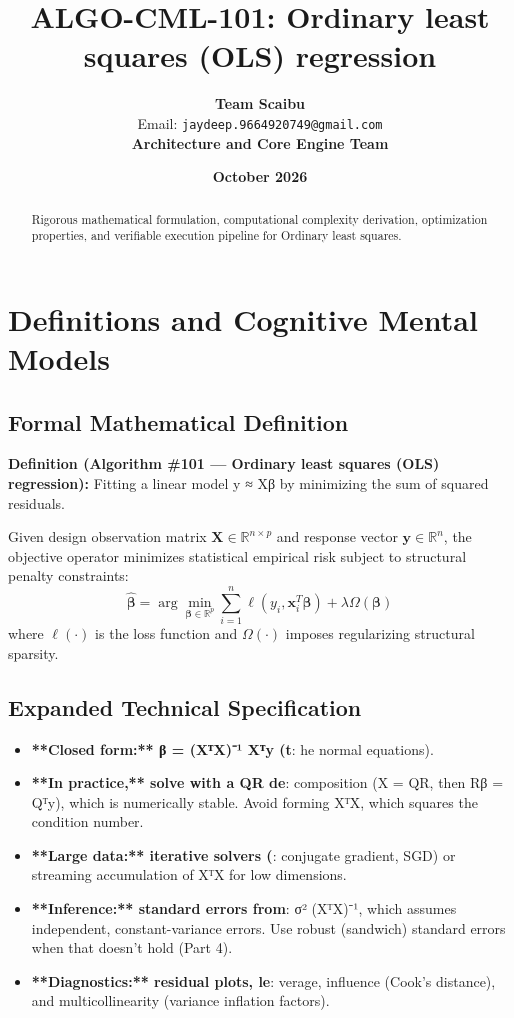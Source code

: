 \documentclass[11pt,a4paper]{article}
\title{\textbf{ALGO-CML-101: Ordinary least squares (OLS) regression}}
\author{\textbf{Team Scaibu} \\ \small Email: \texttt{jaydeep.9664920749@gmail.com} \\ \small \textbf{Architecture and Core Engine Team}}
\date{\textbf{October 2026}}
\theoremstyle{definition}
\begin{document}
\maketitle

\begin{abstract}
Rigorous mathematical formulation, computational complexity derivation, optimization properties, and verifiable execution pipeline for Ordinary least squares.
\end{abstract}

\section{Definitions and Cognitive Mental Models}

\subsection{Formal Mathematical Definition}
\textbf{Definition (Algorithm \#101 --- Ordinary least squares (OLS) regression):}
Fitting a linear model y ≈ Xβ by minimizing the sum of squared residuals.

Given design observation matrix $\mathbf{X} \in \mathbb{R}^{n \times p}$ and response vector $\mathbf{y} \in \mathbb{R}^n$, the objective operator minimizes statistical empirical risk subject to structural penalty constraints:
\begin{equation}
\hat{\boldsymbol{\beta}} = \arg\min_{\boldsymbol{\beta} \in \mathbb{R}^p} \sum_{i=1}^n \ell(y_i, \mathbf{x}_i^T \boldsymbol{\beta}) + \lambda \Omega(\boldsymbol{\beta})
\end{equation}
where $\ell(\cdot)$ is the loss function and $\Omega(\cdot)$ imposes regularizing structural sparsity.

\subsection{Expanded Technical Specification}
\begin{itemize}
\item \textbf{**Closed form:** β = (XᵀX)⁻¹ Xᵀy (t}: he normal equations).
\item \textbf{**In practice,** solve with a QR de}: composition (X = QR, then Rβ = Qᵀy), which is numerically stable. Avoid forming XᵀX, which squares the condition number.
\item \textbf{**Large data:** iterative solvers (}: conjugate gradient, SGD) or streaming accumulation of XᵀX for low dimensions.
\item \textbf{**Inference:** standard errors from}:  σ² (XᵀX)⁻¹, which assumes independent, constant-variance errors. Use robust (sandwich) standard errors when that doesn't hold (Part 4).
\item \textbf{**Diagnostics:** residual plots, le}: verage, influence (Cook's distance), and multicollinearity (variance inflation factors).
\end{itemize}
\end{document}

